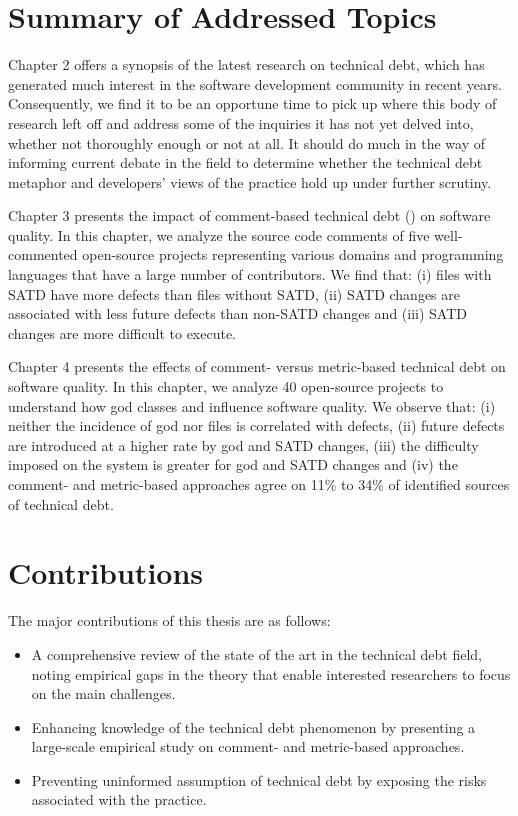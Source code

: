 
\section{Summary of Addressed Topics}


Chapter 2 offers a synopsis of the latest research on technical debt, which has generated much interest in the software development community in recent years. Consequently, we find it to be an opportune time to pick up where this body of research left off and address some of the inquiries it has not yet delved into, whether not thoroughly enough or not at all. It should do much in the way of informing current debate in the field to determine whether the technical debt metaphor and developers' views of the practice hold up under further scrutiny.

Chapter 3 presents the impact of comment-based technical debt (\SATD) on software quality. In this chapter, we analyze the source code comments of five well-commented open-source projects representing various domains and programming languages that have a large number of contributors. We find that: (i) files with SATD have more defects than files without SATD, (ii) SATD changes are associated with less future defects than non-SATD changes and (iii) SATD changes are more difficult to execute.

Chapter 4 presents the effects of comment- versus metric-based technical debt on software quality. In this chapter, we analyze 40 open-source projects to understand how god classes and \SATD influence software quality. We observe that: (i) neither the incidence of god nor \SATD files is correlated with defects, (ii) future defects are introduced at a higher rate by god and SATD changes, (iii) the difficulty imposed on the system is greater for god and SATD changes and (iv) the comment- and metric-based approaches agree on 11\% to 34\% of identified sources of technical debt.

\section{Contributions}
The major contributions of this thesis are as follows:

\begin{itemize}
		\item A comprehensive review of the state of the art in the technical debt field, noting empirical gaps in the theory that enable interested researchers to focus on the main challenges.
		\item Enhancing knowledge of the technical debt phenomenon by presenting a large-scale empirical study on comment- and metric-based approaches.
		\item Preventing uninformed assumption of technical debt by exposing the risks associated with the practice.
\end{itemize}

